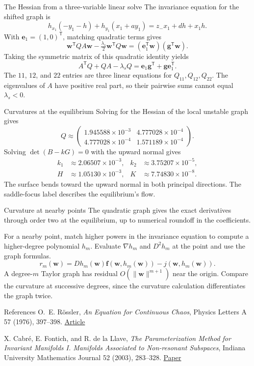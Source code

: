 \documentclass[11pt,aspectratio=169]{beamer}
\newcommand{\vect}[1]{\bm{#1}}
\newcommand{\Rossler}{R\"ossler}
\begin{document}
\begin{frame}{The Hessian from a three-variable linear solve}
The invariance equation for the shifted graph is
\[
  h_{x_1}(-y_1-h)+h_{y_1}(x_1+ay_1)=z_-x_1+dh+x_1h .
\]
With \(\vect{e}_1=(1,0)^{\mathsf T}\), matching quadratic terms gives
\[
  \vect{w}^{\mathsf T}QA\vect{w}
  -\tfrac{\lambda_s}{2}\vect{w}^{\mathsf T}Q\vect{w}
  =(\vect{e}_1^{\mathsf T}\vect{w})(\vect{g}^{\mathsf T}\vect{w}).
\]
Taking the symmetric matrix of this quadratic identity yields
\[
  \boxed{A^{\mathsf T}Q+QA-\lambda_s Q=\vect{e}_1\vect{g}^{\mathsf T}+\vect{g}\vect{e}_1^{\mathsf T}}.
\]
The \(11\), \(12\), and \(22\) entries are three linear equations for
\(Q_{11},Q_{12},Q_{22}\). The eigenvalues of \(A\) have positive real part,
so their pairwise sums cannot equal \(\lambda_s<0\).
\end{frame}

\begin{frame}{Curvatures at the equilibrium}
Solving for the Hessian of the local unstable graph gives
\[
  Q\approx
  \begin{pmatrix}
    1.945588\times10^{-3} & 4.777028\times10^{-4}\\
    4.777028\times10^{-4} & 1.571189\times10^{-4}
  \end{pmatrix}.
\]
Solving \(\det(B-kG)=0\) with the upward normal gives
\[
 \begin{aligned}
 k_1&\approx 2.06507\times10^{-3},&
 k_2&\approx 3.75207\times10^{-5},\\
 H&\approx 1.05130\times10^{-3},&
 K&\approx 7.74830\times10^{-8}.
 \end{aligned}
\]
The surface bends toward the upward normal in both principal directions.
The saddle-focus label describes the equilibrium's flow.
\end{frame}

\begin{frame}{Curvature at nearby points}
The quadratic graph gives the exact derivatives through order two at
the equilibrium, up to numerical roundoff in the coefficients.
\medskip

For a nearby point, match higher powers in the invariance equation
to compute a higher-degree polynomial \(h_m\). Evaluate
\(\nabla h_m\) and \(D^2h_m\) at the point and use the graph formulas.
\[
  r_m(\vect{w})=
  Dh_m(\vect{w}) \vect{f}(\vect{w},h_m(\vect{w}))-j(\vect{w},h_m(\vect{w})).
\]
A degree-\(m\) Taylor graph has residual \(O(\|\vect{w}\|^{m+1})\) near the
origin. Compare the curvature at successive degrees, since the
curvature calculation differentiates the graph twice.
\end{frame}

\begin{frame}{References}
\small
O.~E. \Rossler, \emph{An Equation for Continuous Chaos},
Physics Letters A 57 (1976), 397--398.
\href{https://doi.org/10.1016/0375-9601(76)90101-8}{Article}
\medskip

X. Cabr\'e, E. Fontich, and R. de la Llave,
\emph{The Parameterization Method for Invariant Manifolds I.
Manifolds Associated to Non-resonant Subspaces},
Indiana University Mathematics Journal 52 (2003), 283--328.
\href{https://web.mat.upc.edu/xavier.cabre/docs/indi1jour.pdf}{Paper}
\end{frame}
\end{document}

